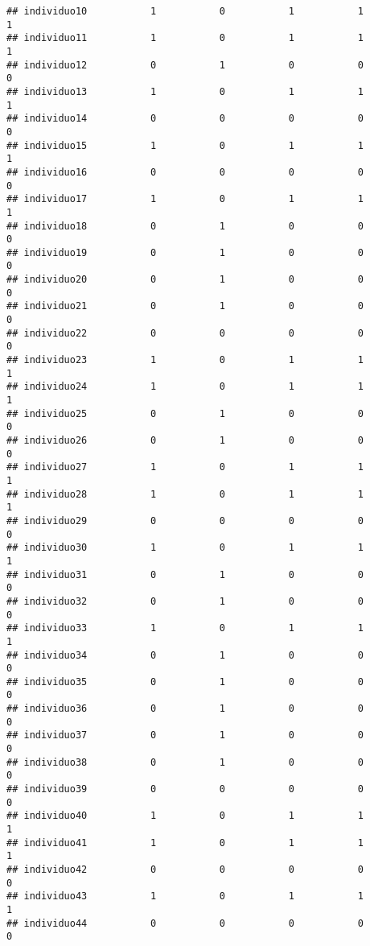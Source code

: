 \documentclass[
]{article}
\begin{document}
\begin{verbatim}
## individuo10           1           0           1           1           1
## individuo11           1           0           1           1           1
## individuo12           0           1           0           0           0
## individuo13           1           0           1           1           1
## individuo14           0           0           0           0           0
## individuo15           1           0           1           1           1
## individuo16           0           0           0           0           0
## individuo17           1           0           1           1           1
## individuo18           0           1           0           0           0
## individuo19           0           1           0           0           0
## individuo20           0           1           0           0           0
## individuo21           0           1           0           0           0
## individuo22           0           0           0           0           0
## individuo23           1           0           1           1           1
## individuo24           1           0           1           1           1
## individuo25           0           1           0           0           0
## individuo26           0           1           0           0           0
## individuo27           1           0           1           1           1
## individuo28           1           0           1           1           1
## individuo29           0           0           0           0           0
## individuo30           1           0           1           1           1
## individuo31           0           1           0           0           0
## individuo32           0           1           0           0           0
## individuo33           1           0           1           1           1
## individuo34           0           1           0           0           0
## individuo35           0           1           0           0           0
## individuo36           0           1           0           0           0
## individuo37           0           1           0           0           0
## individuo38           0           1           0           0           0
## individuo39           0           0           0           0           0
## individuo40           1           0           1           1           1
## individuo41           1           0           1           1           1
## individuo42           0           0           0           0           0
## individuo43           1           0           1           1           1
## individuo44           0           0           0           0           0

\end{verbatim}
\end{document}
